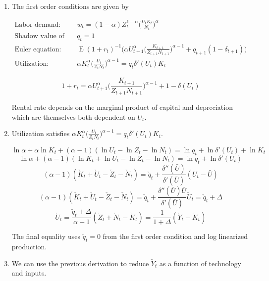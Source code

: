 \documentclass[11pt]{article}
\DeclareMathOperator{\ev}{E}
\begin{document}
    \begin{enumerate}

        \item The first order conditions are given by

            \begin{align*}
                \text{Labor demand:~} & w_t = (1-\alpha) Z_t^{1-\alpha} \bigg ( \frac{U_t K_t}{N_t} \bigg )^\alpha \\
                \text{Shadow value of capital:~} & q_t = 1 \\
                \text{Euler equation:~} & \ev (1+r_t)^{-1} \bigg ( \alpha U_{t+1}^\alpha \bigg ( \frac{K_{t+1}}{Z_{t+1} N_{t+1}} \bigg )^{\alpha-1} + q_{t+1} (1-\delta_{t+1}) \bigg ) \\
                \text{Utilization:~} & \alpha K_t^\alpha \bigg ( \frac{U_t}{Z_t N_t} \bigg )^{\alpha-1} = q_t \delta'(U_t) K_t
            \end{align*}

            $$ 1 + r_t = \alpha U_{t+1}^\alpha \bigg ( \frac{K_{t+1}}{Z_{t+1} N_{t+1}} \bigg )^{\alpha-1} + 1 - \delta(U_t) $$

        Rental rate depends on the marginal product of capital and depreciation which are themselves both dependent on $U_t$.

        \item Utilization satisfies $\alpha K_t^\alpha \big ( \frac{U_t}{Z_t N_t} \big )^{\alpha-1} = q_t \delta'(U_t) K_t$.

            $$ \ln \alpha + \alpha \ln K_t + (\alpha - 1) (\ln U_t - \ln Z_t - \ln N_t) = \ln q_t + \ln \delta'(U_t) + \ln K_t $$
            $$ \ln \alpha + (\alpha - 1) (\ln K_t + \ln U_t - \ln Z_t - \ln N_t) = \ln q_t + \ln \delta'(U_t) $$
            $$ (\alpha - 1) (\check K_t + \check U_t - \check Z_t - \check N_t) = \check q_t + \frac{\delta''(\bar U)}{\delta'(\bar U)} (U_t - \bar U) $$
            $$ (\alpha - 1) (\check K_t + \check U_t - \check Z_t - \check N_t) = \check q_t + \frac{\delta''(\bar U) \bar U}{\delta'(\bar U)} \check U_t = \check q_t + \Delta $$
            $$ \check U_t = \frac{\check q_t + \Delta}{\alpha - 1} (\check Z_t + \check N_t - \check K_t) = \frac{1}{1+\Delta} (\check Y_t - \check K_t) $$

        The final equality uses $\check q_t = 0$ from the first order condition and log linearized production.

        \item We can use the previous derivation to reduce $\check Y_t$ as a function of technology and inputs.


\end{enumerate}
\end{document}
